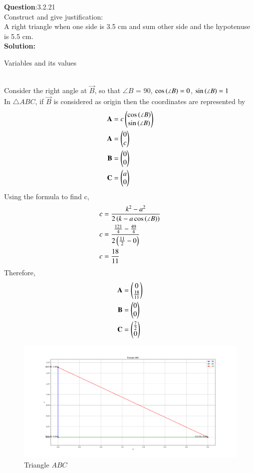 \documentclass[journal]{IEEEtran}
\begin{document}
\textbf{Question}:3.2.21\\
Construct and give justification:\\
A right triangle when one side is 3.5 cm and sum other side and the hypotenuse is 5.5 cm.
\\
\textbf{Solution:}
\renewcommand{\tablename}{Table 3.2.21.1}
\begin{table}[h!]
  \centering
  
  \caption{Variables and its values}
\end{table}
\\
Consider the right angle at $\vec{B}$, so that $\angle B$ = 90\degree, $\cos{\ensuremath{\left(\angle B\right)}} = 0$, $\sin{\ensuremath{\left(\angle B\right)}} = 1$\\
In $\triangle ABC$, if $\vec{B}$ is considered as origin then the coordinates are represented by
 \begin{align}
 \mathbf{A} & = c\begin{pmatrix}\cos{\ensuremath{\left(\angle B\right)}} \\ \sin{\ensuremath{\left(\angle B\right)}}\end{pmatrix} \\
 \mathbf{A} & = \begin{pmatrix}0 \\ c\end{pmatrix} \\
 \mathbf{B} & = \begin{pmatrix}0 \\ 0\end{pmatrix} \\
 \mathbf{C} & = \begin{pmatrix}a \\ 0\end{pmatrix}
 \end{align}
Using the formula to find c,
\begin{align}
c & = \frac{k^2 - a^2}{2\left(k - a\cos{\ensuremath{\left(\angle B\right)}}\right)} \\
c & = \frac{\frac{121}{4} - \frac{49}{4}}{2\left(\frac{11}{2} - 0\right)} \\
c & = \frac{18}{11}
\end{align}
Therefore,
\begin{align}
    \mathbf{A} & = \begin{pmatrix}0 \\ \frac{18}{11}\end{pmatrix} \\
    \mathbf{B} & = \begin{pmatrix}0 \\ 0\end{pmatrix} \\
    \mathbf{C} & = \begin{pmatrix}\frac{7}{2} \\ 0\end{pmatrix}
\end{align}
\begin{figure}[h!]
   \centering
   \includegraphics[width=0.7\linewidth]{figs/triangle.png}
	\caption{Triangle $ABC$}
   \end{figure}
\end{document}
